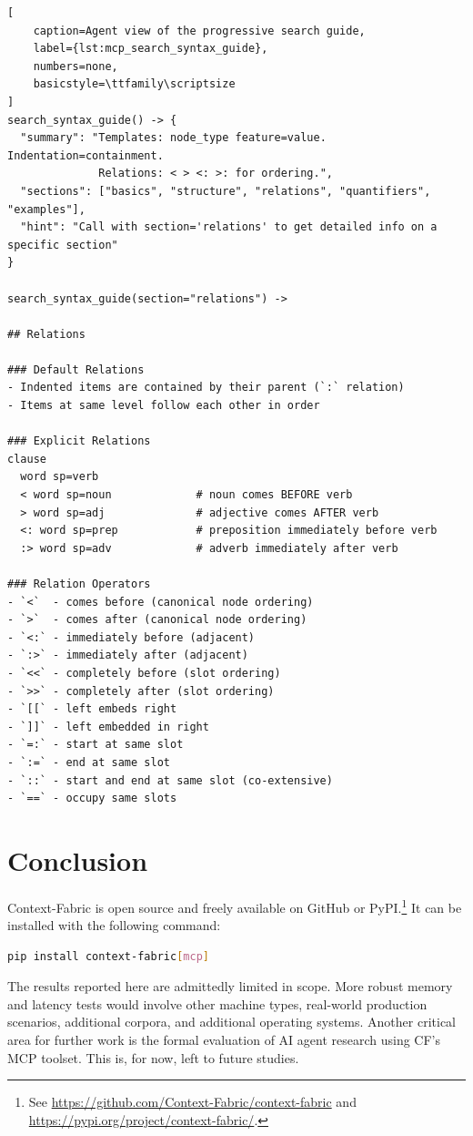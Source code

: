 \documentclass[11pt,a4paper]{article}
\begin{document}
\begin{lstlisting}[
    caption=Agent view of the progressive search guide,
    label={lst:mcp_search_syntax_guide},
    numbers=none,
    basicstyle=\ttfamily\scriptsize
]
search_syntax_guide() -> {
  "summary": "Templates: node_type feature=value. Indentation=containment.
              Relations: < > <: >: for ordering.",
  "sections": ["basics", "structure", "relations", "quantifiers", "examples"],
  "hint": "Call with section='relations' to get detailed info on a specific section"
}

search_syntax_guide(section="relations") ->

## Relations

### Default Relations
- Indented items are contained by their parent (`:` relation)
- Items at same level follow each other in order

### Explicit Relations
clause
  word sp=verb
  < word sp=noun             # noun comes BEFORE verb
  > word sp=adj              # adjective comes AFTER verb
  <: word sp=prep            # preposition immediately before verb
  :> word sp=adv             # adverb immediately after verb

### Relation Operators
- `<`  - comes before (canonical node ordering)
- `>`  - comes after (canonical node ordering)
- `<:` - immediately before (adjacent)
- `:>` - immediately after (adjacent)
- `<<` - completely before (slot ordering)
- `>>` - completely after (slot ordering)
- `[[` - left embeds right
- `]]` - left embedded in right
- `=:` - start at same slot
- `:=` - end at same slot
- `::` - start and end at same slot (co-extensive)
- `==` - occupy same slots
\end{lstlisting}

\section{Conclusion}

Context-Fabric is open source and freely available on GitHub or PyPI.\footnote{
    See \url{https://github.com/Context-Fabric/context-fabric} and
    \url{https://pypi.org/project/context-fabric/}.
}
It can be installed with the following command:

\begin{lstlisting}[language=bash]
pip install context-fabric[mcp]
\end{lstlisting}

The results reported here are admittedly limited in scope. More robust memory and latency
tests would involve other machine types, real-world production scenarios, additional corpora,
and additional operating systems. Another critical area for further work is the formal evaluation
of AI agent research using CF's MCP toolset. This is, for now, left to future studies.
\end{document}
